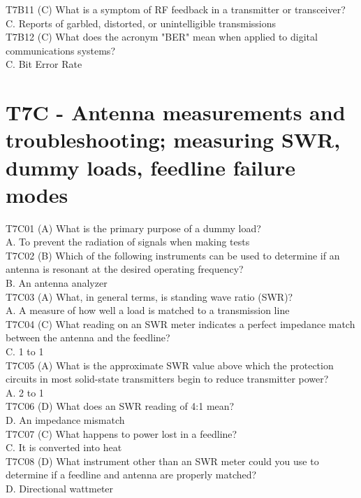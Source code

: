 \documentclass[12pt,letterpaper]{report}
\begin{document}
T7B11 (C) What is a symptom of RF feedback in a transmitter or transceiver?\\
C. Reports of garbled, distorted, or unintelligible transmissions\\

T7B12 (C) What does the acronym "BER" mean when applied to digital communications systems?\\
C. Bit Error Rate\\

\section{T7C - Antenna measurements and troubleshooting; measuring SWR, dummy loads, feedline failure modes}

T7C01 (A) What is the primary purpose of a dummy load?\\
A. To prevent the radiation of signals when making tests\\

T7C02 (B) Which of the following instruments can be used to determine if an antenna is resonant at the desired operating frequency?\\
B. An antenna analyzer\\

T7C03 (A) What, in general terms, is standing wave ratio (SWR)?\\
A. A measure of how well a load is matched to a transmission line\\

T7C04 (C) What reading on an SWR meter indicates a perfect impedance match between the antenna and the feedline?\\
C. 1 to 1\\

T7C05 (A) What is the approximate SWR value above which the protection circuits in most solid-state transmitters begin to reduce transmitter power?\\
A. 2 to 1\\

T7C06 (D) What does an SWR reading of 4:1 mean?\\
D. An impedance mismatch\\

T7C07 (C) What happens to power lost in a feedline?\\
C. It is converted into heat\\

T7C08 (D) What instrument other than an SWR meter could you use to determine if a feedline and antenna are properly matched?\\
D. Directional wattmeter\\
\end{document}
